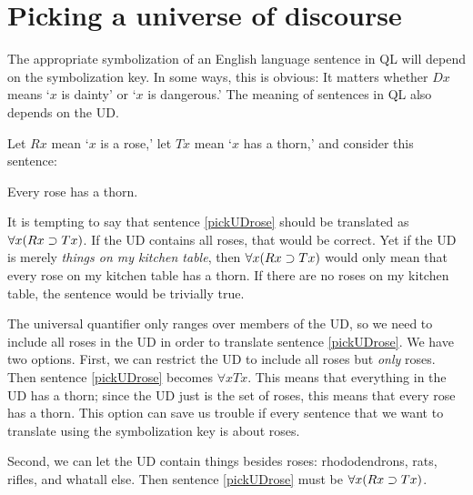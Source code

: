 \begin{table}[t]
\end{table}

\section{Picking a universe of discourse}
The appropriate symbolization of an English language sentence in QL will depend on the symbolization key. In some ways, this is obvious: It matters whether $Dx$ means `$x$ is dainty' or `$x$ is dangerous.' The meaning of sentences in QL also depends on the UD.

Let $Rx$ mean `$x$ is a rose,' let $Tx$ mean `$x$ has a thorn,' and consider this sentence:
\begin{earg}
\item[\ex{pickUDrose}] Every rose has a thorn.
\end{earg}

It is tempting to say that sentence \ref{pickUDrose} should be translated as $\forall x(Rx \supset Tx)$. If the UD contains all roses, that would be correct. Yet if the UD is merely \emph{things on my kitchen table}, then $\forall x(Rx \supset Tx)$ would only mean that every rose on my kitchen table has a thorn. If there are no roses on my kitchen table, the sentence would be trivially true.

The universal quantifier only ranges over members of the UD, so we need to include all roses in the UD in order to translate sentence \ref{pickUDrose}. We have two options. First, we can restrict the UD to include all roses but \emph{only} roses. Then sentence \ref{pickUDrose} becomes $\forall x Tx$. This means that everything in the UD has a thorn; since the UD just is the set of roses, this means that every rose has a thorn. This option can save us trouble if every sentence that we want to translate using the symbolization key is about roses.

Second, we can let the UD contain things besides roses: rhododendrons, rats, rifles, and whatall else. Then sentence \ref{pickUDrose} must be $\forall x(Rx \supset Tx)$.

